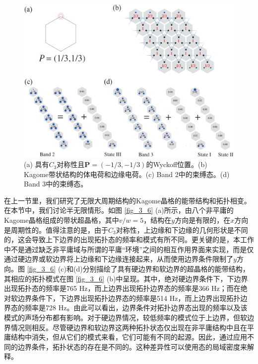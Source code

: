 \begin{figure}[h!]
  \centering
  \includegraphics[width=1\textwidth]{images/fig3-10.eps} 
  \caption{(a) 具有\(C_3\)对称性且\(\mathbf{P}=(-1/3,-1/3)\)的Wyckoff位置。(b) Kagome带状结构的体电荷和边缘电荷。(c) Band 2中的束缚态。(d) Band 3中的束缚态。}
  \label{fig_3_10}
\end{figure}

在上一节里，我们研究了无限大周期结构的Kagome晶格的能带结构和拓扑相变。在本节中，我们讨论半无限情形。如图 \ref{fig_3_6} (a)所示，由八个非平庸的Kagome晶格组成的带状超晶格，其中$v/w = 5$，结构在$y$方向是有限的，在$x$方向是周期性的。值得注意的是，由于$C_3$对称性，上边缘和下边缘的几何形状是不同的\cite{C3-4}，这会导致上下边界的出现拓扑态的频率和模式有所不同。更关键的是，本工作中不是通过缺乏非平庸域与所谓的平庸“环境”之间的相互作用界面来实现，而是仅通过硬边界或软边界将上边缘和下边缘连接起来，从而使用边界条件限制了$y$方向。图 \ref{fig_3_6} (c)和(d)分别描绘了具有硬边界和软边界的超晶格的能带结构，其相应的拓扑模式在图 \ref{fig_3_6} (b)中呈现。其中，绝对硬边界条件下，下边界出现拓扑态的频率是765 Hz，而上边界出现拓扑边界态的频率是366 Hz；而在绝对软边界条件下，下边界出现拓扑边界态的频率是514 Hz，而上边界出现拓扑边界态的频率是728 Hz。由此可以看出，边界条件对拓扑边界态出现的频率以及该模式的声场分布都有影响。对于硬边界情况，较低频率的模式位于上边界，但软边界情况则相反。尽管硬边界和软边界这两种拓扑状态仅出现在非平庸结构中且在平庸结构中消失，但从它们的模式来看，它们可能有不同的起源。因此，通过应用不同的边界条件，拓扑状态的存在是不同的。这种差异性可以使用态的局域密度\cite{C3-5}来解释。

